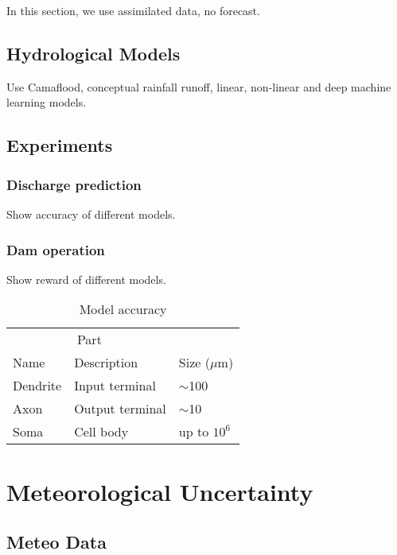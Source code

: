 \documentclass{article}
\begin{document}
In this section, we use assimilated data, no forecast.

\subsection{Hydrological Models}
\label{sec:Hydrological Models}

Use Camaflood, conceptual rainfall runoff, linear, non-linear and deep machine learning models.

\subsection{Experiments}
\label{sec:Hydrological Experiments}

\subsubsection{Discharge prediction}

Show accuracy of different models.

\subsubsection{Dam operation}

Show reward of different models.

\begin{table}
	\caption{Model accuracy}
	\centering
	\begin{tabular}{lll}
		\toprule
		\multicolumn{2}{c}{Part}                   \\
		\cmidrule(r){1-2}
		Name     & Description     & Size ($\mu$m) \\
		\midrule
		Dendrite & Input terminal  & $\sim$100     \\
		Axon     & Output terminal & $\sim$10      \\
		Soma     & Cell body       & up to $10^6$  \\
		\bottomrule
	\end{tabular}
	\label{tab:table}
\end{table}

\section{Meteorological Uncertainty}
\label{sec:Meteorological Uncertainty}

\subsection{Meteo Data}
\label{sec:Meteo Data}
\end{document}

